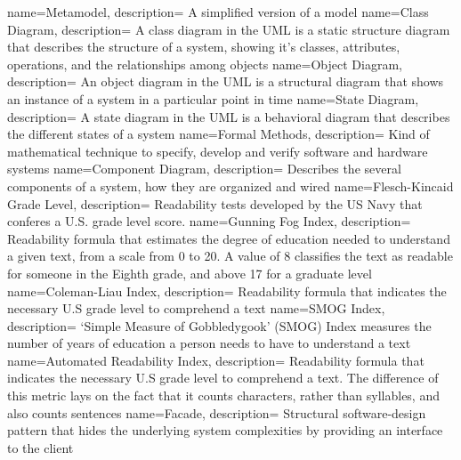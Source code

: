  {
    name={Metamodel},
    description={
    A simplified version of a model
    }
}
 {
    name={Class Diagram},
    description={
    A class diagram in the UML is a static structure diagram that describes the structure of a system, showing it's classes, attributes, operations, and the relationships among objects
    }
}
 {
    name={Object Diagram},
    description={
    An object diagram in the UML is a structural diagram that shows an instance of a system in a particular point in time
    }
}
 {
    name={State Diagram},
    description={
    A state diagram in the UML is a behavioral diagram that describes the different states of a system
    }
}
 {
    name={Formal Methods},
    description={
    Kind of mathematical technique to specify, develop and verify software and hardware systems
    }
}
 {
    name={Component Diagram},
    description={
    Describes the several components of a system, how they are organized and wired
    }
}
 {
    name={Flesch-Kincaid Grade Level},
    description={
    Readability tests developed by the US Navy that conferes a U.S. grade level score.
    }
}
 {
    name={Gunning Fog Index},
    description={
    Readability formula that estimates the degree of education needed to understand a given text, from a scale from 0 to 20. A value of 8 classifies the text as readable for someone in the Eighth grade, and above 17 for a graduate level
    }
}
 {
    name={Coleman-Liau Index},
    description={
    Readability formula that indicates the necessary U.S grade level to comprehend a text
    }
}
 {
    name={SMOG Index},
    description={
    ‘Simple Measure of Gobbledygook’ (SMOG) Index measures the number of years of education a person needs to have to understand a text
    }
}
 {
    name={Automated Readability Index},
    description={
    Readability formula that indicates the necessary U.S grade level to comprehend a text. The difference of this metric lays on the fact that it counts characters, rather than syllables, and also counts sentences
    }
}
 {
    name={Facade},
    description={
    Structural software-design pattern that hides the underlying system complexities by providing an interface to the client
    }
}
